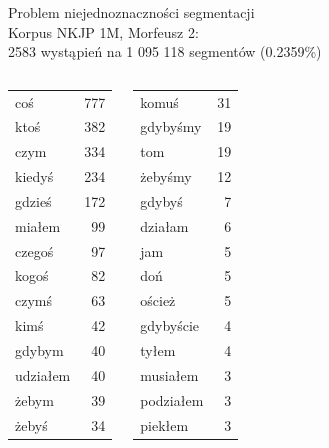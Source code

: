 \documentclass{beamer}
\begin{document}
\begin{frame}{Problem niejednoznaczności segmentacji}
  \\
  Korpus NKJP 1M, Morfeusz 2:\\
  2583 wystąpień na 1 095 118 segmentów (0.2359\%)
  \begin{columns}[c]
    \begin{center}
      \footnotesize
      \begin{tabular}{l|r}
        coś & 777 \\
        ktoś & 382 \\
        czym & 334 \\
        kiedyś & 234 \\
        gdzieś & 172 \\
        miałem & 99 \\
        czegoś & 97 \\
        kogoś & 82 \\
        czymś & 63 \\
        kimś & 42 \\
        gdybym & 40 \\
        udziałem & 40 \\
        żebym & 39 \\
        żebyś & 34 \\
      \end{tabular}
    \end{center}
    \begin{center}
      \footnotesize
      \begin{tabular}{l|r}
        komuś & 31 \\
        gdybyśmy & 19 \\
        tom & 19 \\
        żebyśmy & 12 \\
        gdybyś & 7 \\
        działam & 6 \\
        jam & 5 \\
        doń & 5 \\
        oścież & 5 \\
        gdybyście & 4 \\
        tyłem & 4 \\
        musiałem & 3 \\
        podziałem & 3 \\
        piekłem & 3 \\
      \end{tabular}

\end{center}
\end{columns}
\end{frame}
\end{document}
